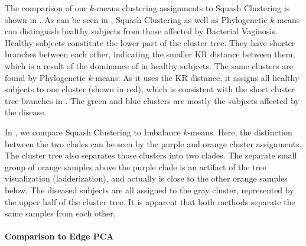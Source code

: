 The comparison of our $k$-means clustering assignments to Squash Clustering is shown in .
As can be seen in , Squash Clustering as well as
Phylogenetic $k$-means can distinguish healthy subjects from those affected by Bacterial Vaginosis.
Healthy subjects constitute the lower part of the cluster tree.
They have shorter branches between each other, indicating the smaller KR distance between them,
which is a result of the dominance of  in healthy subjects.
The same clusters are found by Phylogenetic $k$-means:
As it uses the KR distance, it assigns all healthy subjects to one cluster (shown in red),
which is consistent with the short cluster tree branches in .
The green and blue clusters are mostly the subjects affected by the disease.

In , we compare Squash Clustering to Imbalance $k$-means.
Here, the distinction between the two  clades
can be seen by the purple and orange cluster assignments.
The cluster tree also separates those clusters into two clades.
The separate small group of orange samples above the purple clade is an artifact of the tree visualization (ladderization),
and actually is close to the other orange samples below.
The diseased subjects are all assigned to the gray cluster, represented by the upper half of the cluster tree.
It is apparent that both methods separate the same samples from each other.


\paragraph{Comparison to Edge PCA}
\label{ch:Clustering:sec:Results:sub:BVDataset:par:EdgePCA}

